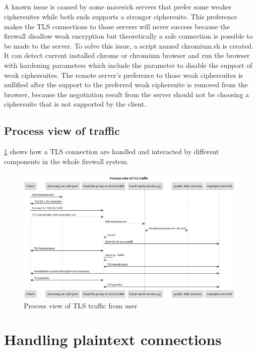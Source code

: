\documentclass[mscthesis]{usiinfthesis}
\begin{document}
\paragraph{}
A known issue is caused by some maverick servers that prefer some weaker ciphersuites while both ends supports a stronger ciphersuite. This preference makes the TLS connections to those servers will never success because the firewall disallow weak encryption but theoretically a safe connection is possible to be made to the server. To solve this issue, a script named chromium.sh is created. It can detect current installed chrome or chromium browser and run the browser with hardening parameters which include the parameter to disable the support of weak ciphersuites. The remote server's preference to those weak ciphersuites is nullified after the support to the preferred weak ciphersuite is removed from the browser, because the negotiation result from the server should not be choosing a ciphersuite that is not supported by the client.

\begin{landscape}
  \section{Process view of traffic}
  \cref{fig:tls-process-view} shows how a TLS connection are handled and interacted by different components in the whole firewall system.
  \begin{figure}[H]
    \includegraphics[width=.9\linewidth]{graphics/puml/process-tls-traffic.png}
    \caption{Process view of TLS traffic from user}
    \label{fig:tls-process-view}
  \end{figure}
\end{landscape}

\chapter{Handling plaintext connections}\label{cha:plaintext}
\end{document}
